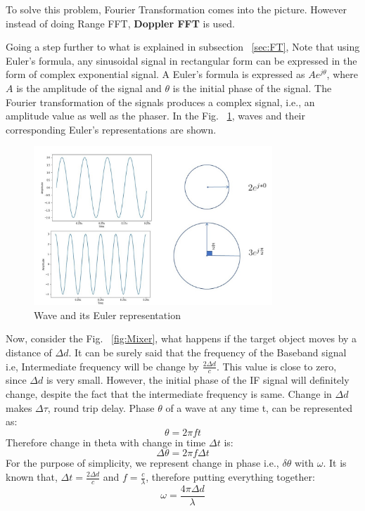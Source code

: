 To solve this problem, Fourier Transformation comes into the picture. However instead of doing Range FFT, \textbf{Doppler FFT} is used.

Going a step further to what is explained in subsection ~\ref{sec:FT}, Note that using Euler's formula, any sinusoidal signal in rectangular form can be expressed in the form of complex exponential signal. A Euler's formula is expressed as \(Ae^{j\theta}\), where $A$ is the amplitude of the signal and $\theta$ is the initial phase of the signal. The Fourier transformation of the signals produces a complex signal, i.e., an amplitude value as well as the phaser. 
In the Fig. ~\ref{fig:euler}, waves and their corresponding Euler's representations are shown.

 \begin{figure}[ht]
  \begin{center}
    \includegraphics[width=0.8\textwidth]{Master's thesis/images/euler.jpg} 
    \caption{Wave and its Euler representation}
    \label{fig:euler}
  \end{center}
\end{figure}  

Now, consider the Fig. ~\ref{fig:Mixer}, what happens if the target object moves by a distance of $\Delta d$. It can be surely said that the frequency of the Baseband signal i.e, Intermediate frequency will be change by $\frac{2\Delta d}{c}$. This value is close to zero, since $\Delta d$ is very small. However, the initial phase of the IF signal will definitely change, despite the fact that the intermediate frequency is same. Change in $\Delta d$ makes $\Delta\tau$, round trip delay.
Phase $\theta$ of a wave at any time t, can be represented as:
 \begin{equation}
     \theta= 2\pi ft
 \end{equation}
Therefore change in theta with change in time $\Delta t$ is:
 \begin{equation}
     \Delta\theta= 2\pi f\Delta t
 \end{equation}
 For the purpose of simplicity, we represent change in phase i.e., $\delta \theta$ with $\omega$. It is known that, $\Delta t= \frac{2\Delta d}{c}$ and $f= \frac{c}{\lambda}$, therefore putting everything together:
 \begin{equation}\label{eq:theta}
     \omega= \frac{4\pi \Delta d}{\lambda}
 \end{equation} 


